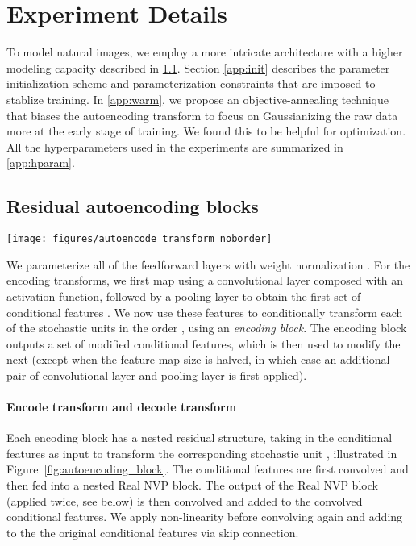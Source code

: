 \documentclass{article}
\begin{document}
\clearpage

\section{Experiment Details}
\label{app:exp}
To model natural images, we employ a more intricate architecture with a higher modeling capacity described in \ref{app:raeb}. 
Section \ref{app:init} describes the parameter initialization scheme and parameterization constraints that are imposed to stablize training. 
In \ref{app:warm}, we propose an objective-annealing technique that biases the autoencoding transform to 
focus on Gaussianizing the raw data more at the early stage of training.
We found this to be helpful for optimization. 
All the hyperparameters used in the experiments are summarized in \ref{app:hparam}. 


\subsection{Residual autoencoding blocks}
\label{app:raeb}
\begin{figure*}[h!]
	\centering
	\texttt{[image: figures/autoencode\_transform\_noborder]}
	\caption{Architecture of a single encode transform block and a single decode transform block.}
	\label{fig:autoencoding_block}
\end{figure*}

We parameterize all of the feedforward layers with weight normalization \citep{salimans2016weight}. 
For the encoding transforms, we first map  using a convolutional layer composed with an activation function, followed by a pooling layer to obtain the first set of conditional features . 
We now use these features to conditionally transform each of the stochastic units in the order , using an \emph{encoding block}.
The encoding block outputs a set of modified conditional features, which is then used to modify the next  (except when the feature map size is halved, in which case an additional pair of convolutional layer and pooling layer is first applied).

 

\paragraph{Encode transform and decode transform} 
Each encoding block has a nested residual structure, taking in the conditional features as input to transform the corresponding stochastic unit , illustrated in Figure~\ref{fig:autoencoding_block}. 
The conditional features are first convolved and then fed into a nested Real NVP block.   
The output of the Real NVP block (applied twice, see below) is then convolved and added to the convolved conditional features.
We apply non-linearity before convolving again and adding to the the original conditional features via skip connection.
\end{document}

